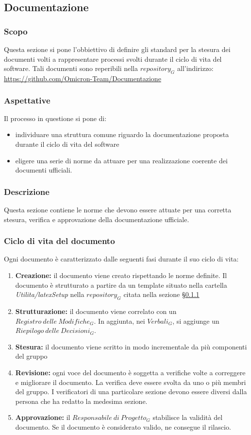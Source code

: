 \subsection{Documentazione}\label{3.1}

\subsubsection{Scopo}\label{3.1.1}
Questa sezione si pone l'obbiettivo di definire gli standard per la stesura dei documenti volti a rappresentare processi svolti durante il ciclo di vita del software. Tali documenti sono reperibili nella $repository_{G}$ all'indirizzo: \url{https://github.com/Omicron-Team/Documentazione}

\subsubsection{Aspettative}
Il processo in questione si pone di:
\begin{itemize}
\item individuare una struttura comune riguardo la documentazione proposta durante il ciclo di vita del software
\item eligere una serie di norme da attuare per una realizzazione coerente dei documenti ufficiali.
\end{itemize}

\subsubsection{Descrizione}
Questa sezione contiene le norme che devono essere attuate per una corretta stesura, verifica e approvazione della documentazione ufficiale.

\subsubsection{Ciclo di vita del documento}
Ogni documento è caratterizzato dalle seguenti fasi durante il suo ciclo di vita:
\begin{enumerate}
	\item \textbf{Creazione:} il documento viene creato rispettando le norme definite. Il documento è strutturato a partire da un template situato nella cartella \textit{Utilita/latexSetup} nella $repository_G$ citata nella sezione §\ref{3.1.1}
	\item \textbf{Strutturazione:} il documento viene correlato con un $Registro\:delle\: Modifiche_G$. In aggiunta, nei $Verbali_G$, si aggiunge un $Riepilogo\:delle\:Decisioni_G$.
	\item \textbf{Stesura:} il documento viene scritto in modo incrementale da più componenti del gruppo
	\item \textbf{Revisione:} ogni voce del documento è soggetta a verifiche volte a correggere e migliorare il documento. La verifica deve essere svolta da uno o più membri del gruppo. I verificatori di una particolare sezione devono essere diversi dalla persona che ha redatto la medesima sezione.
	\item \textbf{Approvazione:} il $Responsabile\:di\:Progetto_G$ stabilisce la validità del documento. Se il documento è considerato valido, ne consegue il rilascio.
\end{enumerate}